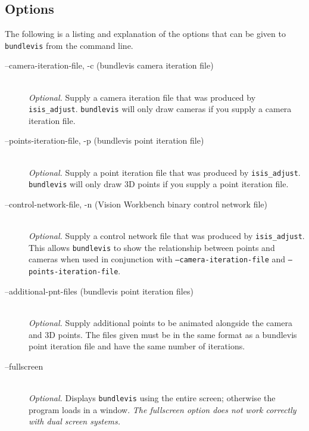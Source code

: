 \subsection{Options}

The following is a listing and explanation of the options
that can be given to \texttt{bundlevis} from the command line.

\begin{description}

\item[--camera-iteration-file, -c \textnormal{\small{(bundlevis camera iteration file)}}] \hfill \\
  \emph{Optional.} Supply a camera iteration file that was produced by
       \texttt{isis\_adjust}.  \texttt{bundlevis} will only draw cameras
       if you supply a camera iteration file.

\item[--points-iteration-file, -p \textnormal{\small{(bundlevis point iteration file)}}] \hfill \\
  \emph{Optional.} Supply a point iteration file that was produced by
       \texttt{isis\_adjust}.  \texttt{bundlevis} will only draw 3D points
       if you supply a point iteration file.

\item[--control-network-file, -n \textnormal{\small{(Vision Workbench binary control network file)}}] \hfill \\
  \emph{Optional.} Supply a control network file that was produced by
       {\tt isis\_adjust}.  This allows {\tt bundlevis} to show the
       relationship between points and cameras when used in
       conjunction with \texttt{--camera-iteration-file} and
       \texttt{--points-iteration-file}.

\item[--additional-pnt-files \textnormal{\small{(bundlevis point iteration files)}}] \hfill \\
  \emph{Optional.} Supply additional points to be animated alongside
  the camera and 3D points.  The files given must be in the same
  format as a bundlevis point iteration file and have the same number
  of iterations.

\item[--fullscreen] \hfill \\
  \emph{Optional.} Displays \texttt{bundlevis} using the entire screen;
  otherwise the program loads in a window. \emph{The fullscreen option
    does not work correctly with dual screen systems.}


\end{description}
